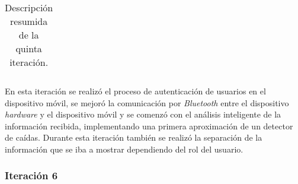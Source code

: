 \begin{table}[!h]
\begin{tabular}{|c|c|l|l|l|c|}
\end{tabular}
\caption{Descripción resumida de la quinta iteración.}
\end{table}

En esta iteración se realizó el proceso de autenticación de usuarios en el dispositivo móvil, se mejoró la comunicación por \textit{Bluetooth} entre el dispositivo \textit{hardware} y el dispositivo móvil y se comenzó con el análisis inteligente de la información recibida, implementando una primera aproximación de un detector de caídas. Durante esta iteración también se realizó la separación de la información que se iba a mostrar dependiendo del rol del usuario.

\subsubsection{Iteración 6}

